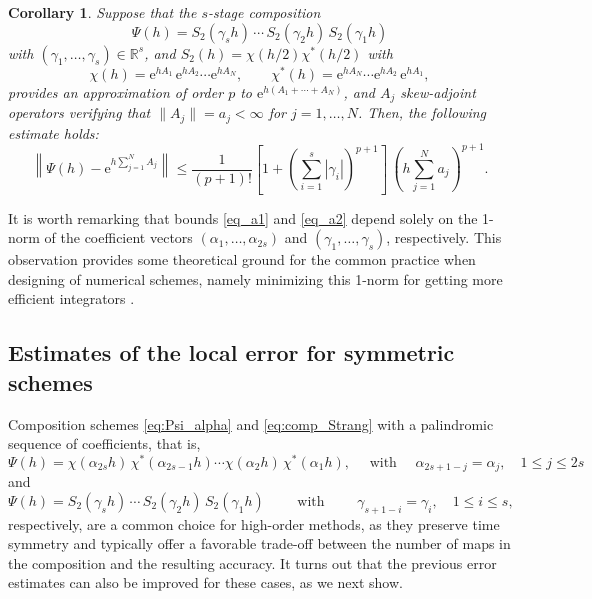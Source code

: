 \documentclass[11pt]{article}
\newcommand{\e}{\ensuremath{\mathrm{e}}}
\newtheorem{corollary}[lemma]{Corollary}
\begin{document}
\begin{corollary} \label{th_compoS}
Suppose that the $s$-stage composition 
\[
  \Psi(h) = S_2(\gamma_s h) \,  \cdots \, S_2(\gamma_2 h) \, S_2(\gamma_1 h)
\]
with $(\gamma_1, \ldots, \gamma_s) \in \mathbb{R}^s$, and $S_2(h) = \chi(h/2) \chi^*(h/2)$ with
\[
  \chi(h) = \e^{h A_1} \, \e^{h A_2} \cdots \e^{h A_N}, \qquad \chi^*(h) = \e^{h A_N} \cdots \e^{h A_2} \, \e^{h A_1}, 
\]
 provides an approximation of order $p$ to $\e^{h(A_1 + \cdots + A_N)}$,
and $A_j$ skew-adjoint operators verifying that $\|A_j\| = a_j < \infty$ for $j=1,\ldots, N$. Then, the following estimate holds:
\begin{equation}  \label{eq_a2}
  \left\|\Psi(h)-\e^{h \sum_{j=1}^N A_j} \right\| \le \frac{1}{(p+1)!} \left[ 1 +  \left( \sum_{i=1}^s |\gamma_i| \right)^{p+1} \right] \, \left(h \sum_{j=1}^N a_j \right)^{p+1}.
\end{equation}
\end{corollary}
It is worth remarking that bounds \eqref{eq_a1} and \eqref{eq_a2} depend solely on the 1-norm of the coefficient vectors $(\alpha_1, \ldots, \alpha_{2s})$ and
$(\gamma_1, \ldots, \gamma_s)$, respectively. This observation provides some theoretical ground for the common practice  when designing of numerical schemes, namely minimizing this 1-norm for getting more efficient integrators \cite{blanes24smf}.

\subsection{Estimates of the local error for symmetric schemes}
\label{subsec_2.3}

Composition schemes \eqref{eq:Psi_alpha} and \eqref{eq:comp_Strang} with a palindromic sequence of coefficients, that is,
\begin{equation} \label{palindromic_alpha}
  \Psi(h) = \chi(\alpha_{2s} h) \, \chi^*(\alpha_{2s-1} h) \cdots \chi(\alpha_2 h) \, \chi^*(\alpha_1 h), 
     \quad \mbox{ with } \quad \alpha_{2s+1-j} = \alpha_j, \quad 1 \leq j \leq 2s
\end{equation}
and
\begin{equation}
\label{eq:palindromic_gamma}
\Psi(h) = S_2(\gamma_s h) \,  \cdots \, S_2(\gamma_2 h) \, S_2(\gamma_1 h) \qquad \mbox{ with } \qquad \gamma_{s+1-i} = \gamma_i, \quad 1 \leq i \leq s,
\end{equation}
respectively, are a common choice for high-order methods, as they preserve time symmetry and typically offer a favorable trade-off between the number of maps in the composition and the resulting accuracy.
It turns out that the previous error estimates can also be improved for these cases, as we next show.
\end{document}

